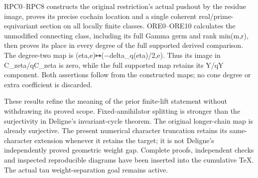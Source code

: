 RPC0--RPC8 constructs the original restriction's actual pushout by the
residue image, proves its precise cochain location and a single coherent
real/prime-equivariant section on all locally finite classes.
ORE0--ORE10 calculates the unmodified connecting class, including its
full Gamma germ and rank min(m,r), then proves its place in every degree
of the full supported derived comparison. The degree-two map is
(eta,e)↦(−delta\_q(eta)/2,e). Thus its image in C\_zeta/qC\_zeta is
zero, while the full supported map retains its Y/qY component. Both
assertions follow from the constructed maps; no cone degree or extra
coefficient is discarded.

These results refine the meaning of the prior finite-lift statement
without withdrawing its proved scope. Fixed-annihilator splitting is
stronger than the surjectivity in Deligne's invariant-cycle theorem. The
original longer-chain map is already surjective. The present numerical
character truncation retains its same-character extension whenever it
retains the target; it is not Deligne's independently proved geometric
weight gap. Complete proofs, independent checks and inspected
reproducible diagrams have been inserted into the cumulative TeX. The
actual tau weight-separation goal remains active.
